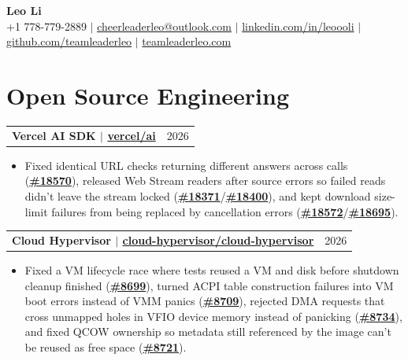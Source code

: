 \documentclass[letterpaper,11pt]{article}
\makeatletter
\newcommand{\resumeHeadingSimple}[2]{%
  \begin{tabularx}{\textwidth}{@{}Xr@{}}
    \textbf{#1} & #2
  \end{tabularx}\vspace{-0.25pt}
}
\newcommand{\resumeItemListStart}{\begin{itemize}[leftmargin=0.23in,itemsep=1.2pt,parsep=0pt,topsep=1.0pt]}
\newcommand{\resumeItem}[1]{\item\fontsize{10.6pt}{12.2pt}\selectfont #1}
\newcommand{\resumeItemListEnd}{\end{itemize}\vspace{-0.25pt}}
\makeatother
\begin{document}
\begin{center}
  {\Huge\textbf{Leo Li}} \\[2pt]
  \small
  +1 778-779-2889 $|$
  \href{mailto:cheerleaderleo@outlook.com}{cheerleaderleo@outlook.com} $|$
  \href{https://www.linkedin.com/in/leoooli/}{linkedin.com/in/leoooli} $|$
  \href{https://github.com/teamleaderleo}{github.com/teamleaderleo} $|$
  \href{https://teamleaderleo.com/}{teamleaderleo.com}
\end{center}
\vspace{-10pt}

\section{Open Source Engineering}

\resumeHeadingSimple
  {Vercel AI SDK $|$ \href{https://redirect.github.com/vercel/ai}{vercel/ai}}
  {2026}
\resumeItemListStart
  \resumeItem{Fixed identical URL checks returning different answers across calls (\href{https://redirect.github.com/vercel/ai/pull/18570}{\textbf{\#18570}}), released Web Stream readers after source errors so failed reads didn't leave the stream locked (\href{https://redirect.github.com/vercel/ai/pull/18371}{\textbf{\#18371}}/\href{https://redirect.github.com/vercel/ai/pull/18400}{\textbf{\#18400}}), and kept download size-limit failures from being replaced by cancellation errors (\href{https://redirect.github.com/vercel/ai/pull/18572}{\textbf{\#18572}}/\href{https://redirect.github.com/vercel/ai/pull/18695}{\textbf{\#18695}}).}
\resumeItemListEnd

\resumeHeadingSimple
  {Cloud Hypervisor $|$ \href{https://redirect.github.com/cloud-hypervisor/cloud-hypervisor}{cloud-hypervisor/cloud-hypervisor}}
  {2026}
\resumeItemListStart
  \resumeItem{Fixed a VM lifecycle race where tests reused a VM and disk before shutdown cleanup finished (\href{https://redirect.github.com/cloud-hypervisor/cloud-hypervisor/pull/8699}{\textbf{\#8699}}), turned ACPI table construction failures into VM boot errors instead of VMM panics (\href{https://redirect.github.com/cloud-hypervisor/cloud-hypervisor/pull/8709}{\textbf{\#8709}}), rejected DMA requests that cross unmapped holes in VFIO device memory instead of panicking (\href{https://redirect.github.com/cloud-hypervisor/cloud-hypervisor/pull/8734}{\textbf{\#8734}}), and fixed QCOW ownership so metadata still referenced by the image can't be reused as free space (\href{https://redirect.github.com/cloud-hypervisor/cloud-hypervisor/pull/8721}{\textbf{\#8721}}).}
\resumeItemListEnd
\end{document}
